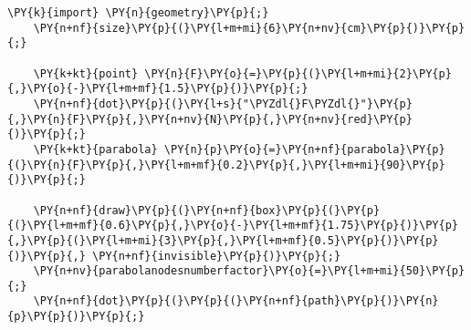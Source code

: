 \begin{Verbatim}[commandchars=\\\{\}]
    \PY{k}{import} \PY{n}{geometry}\PY{p}{;}
    \PY{n+nf}{size}\PY{p}{(}\PY{l+m+mi}{6}\PY{n+nv}{cm}\PY{p}{)}\PY{p}{;}

    \PY{k+kt}{point} \PY{n}{F}\PY{o}{=}\PY{p}{(}\PY{l+m+mi}{2}\PY{p}{,}\PY{o}{-}\PY{l+m+mf}{1.5}\PY{p}{)}\PY{p}{;}
    \PY{n+nf}{dot}\PY{p}{(}\PY{l+s}{"\PYZdl{}F\PYZdl{}"}\PY{p}{,}\PY{n}{F}\PY{p}{,}\PY{n+nv}{N}\PY{p}{,}\PY{n+nv}{red}\PY{p}{)}\PY{p}{;}
    \PY{k+kt}{parabola} \PY{n}{p}\PY{o}{=}\PY{n+nf}{parabola}\PY{p}{(}\PY{n}{F}\PY{p}{,}\PY{l+m+mf}{0.2}\PY{p}{,}\PY{l+m+mi}{90}\PY{p}{)}\PY{p}{;}

    \PY{n+nf}{draw}\PY{p}{(}\PY{n+nf}{box}\PY{p}{(}\PY{p}{(}\PY{l+m+mf}{0.6}\PY{p}{,}\PY{o}{-}\PY{l+m+mf}{1.75}\PY{p}{)}\PY{p}{,}\PY{p}{(}\PY{l+m+mi}{3}\PY{p}{,}\PY{l+m+mf}{0.5}\PY{p}{)}\PY{p}{)}\PY{p}{,} \PY{n+nf}{invisible}\PY{p}{)}\PY{p}{;}
    \PY{n+nv}{parabolanodesnumberfactor}\PY{o}{=}\PY{l+m+mi}{50}\PY{p}{;}
    \PY{n+nf}{dot}\PY{p}{(}\PY{p}{(}\PY{n+nf}{path}\PY{p}{)}\PY{n}{p}\PY{p}{)}\PY{p}{;}
\end{Verbatim}

